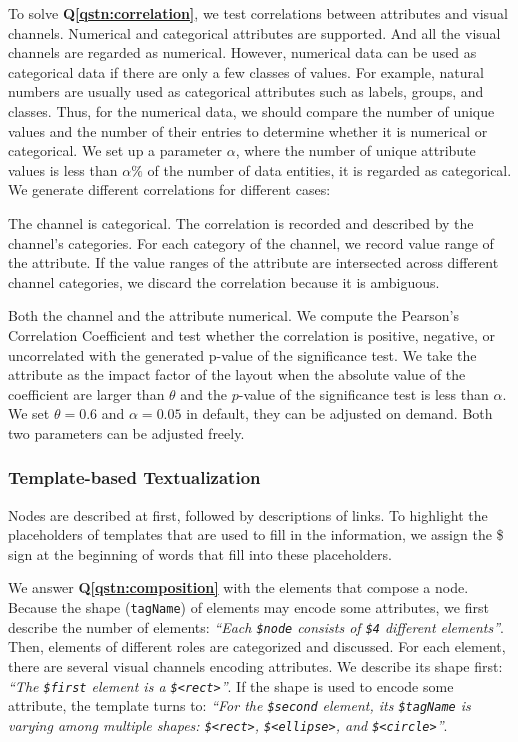 To solve \textbf{Q\ref{qstn:correlation}}, we test correlations between attributes and visual channels.
Numerical and categorical attributes are supported.
And all the visual channels are regarded as numerical.
However, numerical data can be used as categorical data if there are only a few classes of values.
For example, natural numbers are usually used as categorical attributes such as labels, groups, and classes.
Thus, for the numerical data, we should compare the number of unique values and the number of their entries to determine whether it is numerical or categorical.
We set up a parameter $\alpha$, where the number of unique attribute values is less than $\alpha \%$ of the number of data entities, it is regarded as categorical.
We generate different correlations for different cases:
\begin{compactitem}
    \item The channel is categorical. The correlation is recorded and described by the channel's categories. For each category of the channel, we record value range of the attribute. %
    If the value ranges of the attribute are intersected across different channel categories, we discard the correlation because it is ambiguous.
    \item Both the channel and the attribute numerical. We compute the Pearson's Correlation Coefficient and test whether the correlation is positive, negative, or uncorrelated with the generated p-value of the significance test. We take the attribute as the impact factor of the layout when the absolute value of the coefficient are larger than $\theta$ and the $p$-value of the significance test is less than $\alpha$. We set $\theta = 0.6$ and $\alpha = 0.05$ in default, they can be adjusted on demand.
    Both two parameters can be adjusted freely.
\end{compactitem}


\subsubsection {Template-based Textualization}
Nodes are described at first, followed by descriptions of links. 
To highlight the placeholders of templates that are used to fill in the information, we assign the \$ sign at the beginning of words that fill into these placeholders.

We answer \textbf{Q\ref{qstn:composition}} with the elements that compose a node.
Because the shape (\texttt{tagName}) of elements may encode some attributes, we first describe the number of elements:
\textit{``Each \texttt{\$node} consists of \texttt{\$4} different elements''}. 
Then, elements of different roles are categorized and discussed. 
For each element, there are several visual channels encoding attributes.
We describe its shape first: \textit{``The \texttt{\$first} element is a \texttt{\$<rect>}''}.
If the shape is used to encode some attribute, the template turns to: \textit{``For the \texttt{\$second} element, its \texttt{\$tagName} is varying among multiple shapes: \texttt{\$<rect>}, \texttt{\$<ellipse>}, and \texttt{\$<circle>}''}.

